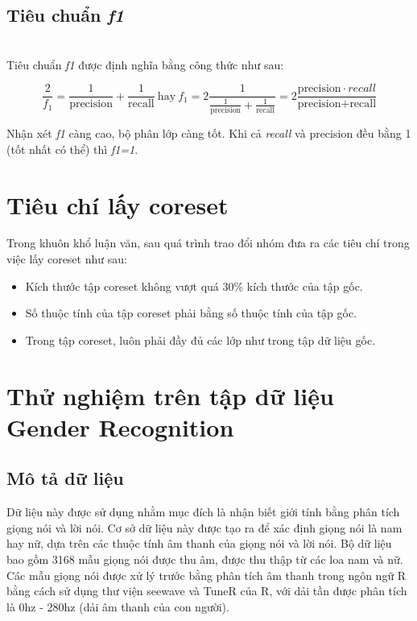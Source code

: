 \documentclass[a4paper, 12pt, oneside]{report}
\begin{document}
\subsection{Tiêu chuẩn \textit{f1}} \\
Tiêu chuẩn \textit{f1} được định nghĩa bằng công thức như sau: \\
\begin{mybox}
$$\frac{2}{f_1} = \frac{1}{\text{precision}} + \frac{1}{\text{recall}} ~ \text{hay} ~ f_1 = 2\frac{1}{\frac{1}{\text{precision}} + \frac{1}{\text{recall}}} = 2\frac{\text{precision}\cdot{recall}}{\text{precision} + \text{recall}}$$
\end{mybox}
Nhận xét \textit{f1} càng cao, bộ phân lớp càng tốt. Khi cả \textit{recall} và precision đều bằng 1 (tốt nhất có thể) thì \textit{f1=1}.
\section{Tiêu chí lấy coreset}
Trong khuôn khổ luận văn, sau quá trình trao đổi nhóm đưa ra các tiêu chí trong việc lấy coreset như sau:
\begin{itemize}
    \item Kích thước tập coreset không vượt quá 30\% kích thước của tập gốc.
    \item Số thuộc tính của tập coreset phải bằng số thuộc tính của tập gốc.
    \item Trong tập coreset, luôn phải đầy đủ các lớp như trong tập dữ liệu gốc.
\end{itemize}
\section{Thử nghiệm trên tập dữ liệu Gender Recognition}
\subsection{Mô tả dữ liệu}
Dữ liệu này được sử dụng nhằm mục đích là nhận biết giới tính bằng phân tích giọng nói và lời nói. Cơ sở dữ liệu này được tạo ra để xác định giọng nói là nam hay nữ, dựa trên các thuộc tính âm thanh của giọng nói và lời nói. Bộ dữ liệu bao gồm 3168 mẫu giọng nói được thu âm, được thu thập từ các loa nam và nữ. Các mẫu giọng nói được xử lý trước bằng phân tích âm thanh trong ngôn ngữ R bằng cách sử dụng thư viện seewave và TuneR của R, với dải tần được phân tích là 0hz - 280hz (dải âm thanh của con người).
\end{document}
